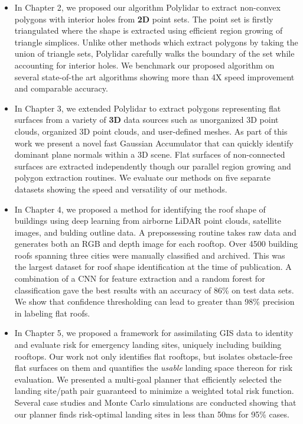 \begin{itemize}
    \item In Chapter 2, we proposed our algorithm Polylidar to extract non-convex polygons with interior holes from \textbf{2D} point sets. The point set is firstly triangulated where the shape is extracted using efficient region growing of triangle simplices. Unlike other methods which extract polygons by taking the union of triangle sets, Polylidar carefully walks the boundary of the set while accounting for interior holes. We benchmark our proposed algorithm on several state-of-the art algorithms showing more than 4X speed improvement and comparable accuracy.  
    \item In Chapter 3, we extended Polylidar to extract polygons representing flat surfaces from a variety of \textbf{3D} data sources such as unorganized 3D point clouds, organized 3D point clouds, and user-defined meshes. As part of this work we present a novel fast Gaussian Accumulator that can quickly identify dominant plane normals within a 3D scene. Flat surfaces of non-connected surfaces are extracted independently though our parallel region growing and polygon extraction routines. We evaluate our methods on five separate datasets showing the speed and versatility of our methods.
    \item In Chapter 4, we proposed a method for identifying the roof shape of buildings using deep learning from airborne LiDAR point clouds, satellite images, and bulding outline data. A prepossessing routine takes raw data and generates both an RGB and depth image for each rooftop. Over 4500 building roofs spanning three cities were manually classified and archived. This was the largest dataset for roof shape identification at the time of publication. A combination of a \ac{CNN} for feature extraction and a random forest for classification gave the best results with an accuracy of 86\% on test data sets.  We show that confidence thresholding can lead to greater than 98\% precision in labeling flat roofs.
    \item In Chapter 5, we proposed a framework for assimilating \ac{GIS} data to identity and evaluate risk for emergency landing sites, uniquely including building rooftops. Our work not only identifies flat rooftops, but isolates obstacle-free flat surfaces on them and quantifies the \emph{usable} landing space thereon for risk evaluation. We presented a multi-goal planner that efficiently selected the landing site/path pair guaranteed to minimize a weighted total risk function. Several case studies and Monte Carlo simulations are conducted showing that our planner finds risk-optimal landing sites in  less than 50ms for 95\% cases.

\end{itemize}
